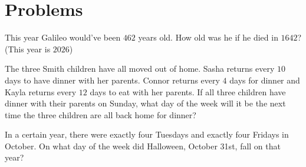 \documentclass{article}
\theoremstyle{mytheoremstyle}
\theoremstyle{mytheoremstyle}
\theoremstyle{myproblemstyle}
\begin{document}
    \section{Problems}

    \begin{problem}
        This year Galileo would've been $462$ years old. How old was he if he died in $1642$? (This year is $2026$)
    \end{problem}

    \begin{problem}
        The three Smith children have all moved out of home. Sasha returns every $10$ days to have dinner with her parents. Connor returns every $4$ days for dinner and Kayla returns every $12$ days to eat with her parents. If all three children have dinner with their parents on Sunday, what day of the week will it be the next time the three children are all back home for dinner?
    \end{problem}

    \begin{problem}
        In a certain year, there were exactly four Tuesdays and exactly four Fridays in October. On what day of the week did Halloween, October 31st, fall on that year?
    \end{problem}
\end{document}
